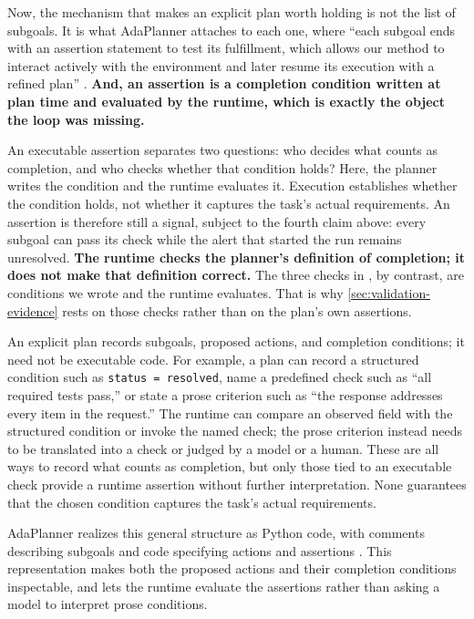 Now, the mechanism that makes an explicit plan worth holding is not the list of subgoals. It is what
AdaPlanner attaches to each one, where ``each subgoal ends with an assertion statement to test its
fulfillment, which allows our method to interact actively with the environment and later resume its
execution with a refined plan'' \citep[\S3.1]{sun2023adaplanner}. \textbf{And, an assertion is a
completion condition written at plan time and evaluated by the runtime, which is exactly the object
the loop was missing.}

An executable assertion separates two questions: who decides what counts as completion, and who
checks whether that condition holds? Here, the planner writes the condition and the runtime
evaluates it. Execution establishes whether the condition holds, not whether it captures the task's
actual requirements. An assertion is therefore still a signal, subject to the fourth claim above:
every subgoal can pass its check while the alert that started the run remains unresolved.
\textbf{The runtime checks the planner's definition of completion; it does not make that definition
correct.} The three checks in , by contrast, are conditions we wrote and the runtime
evaluates. That is why \cref{sec:validation-evidence} rests on those checks rather than on the
plan's own assertions.

An explicit plan records subgoals, proposed actions, and completion conditions; it need not be
executable code. For example, a plan can record a structured condition such as
\texttt{status = resolved}, name a predefined check such as ``all required tests pass,'' or
state a prose criterion such as ``the response addresses every item in the request.''
The runtime can compare an observed field with the structured condition or invoke the named check;
the prose criterion instead needs to be translated into a check or judged by a model or a human.
These are all ways to record what counts as completion, but only those tied to an executable
check provide a runtime assertion without further interpretation. None guarantees that the
chosen condition captures the task's actual requirements.

AdaPlanner realizes this general structure as Python code, with comments describing
subgoals and code specifying actions and assertions \citep[\S3.1]{sun2023adaplanner}.
This representation makes both the proposed actions and their completion conditions inspectable,
and lets the runtime evaluate the assertions rather than asking a model to interpret prose conditions.

